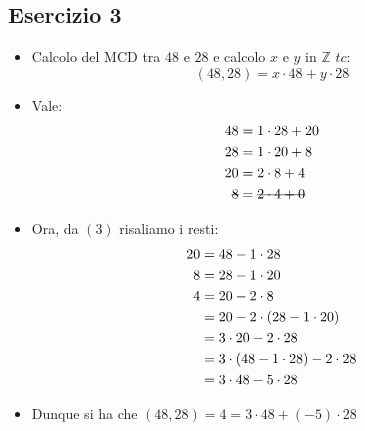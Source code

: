 \documentclass[10pt]{article}
\begin{document}
	\subsection{Esercizio 3}
	\begin{itemize}
	\item
	Calcolo del MCD tra $48$ e $28$ e calcolo $x$ e $y$ in $\mathbb{Z}$ $tc:$ $$(48,28) = x \cdot 48 + y \cdot 28$$
	\item
	Vale:
	\begin{equation}
	\begin{split}
	48 &= 1 \cdot 28 + 20 \\
	28 &= 1 \cdot 20 + 8 \\
	20 &= 2 \cdot 8 + 4 \\
	\hbox{\sout{$8$}} &= \hbox{\sout{$2 \cdot 4 + 0$}}
	\end{split}
	\end{equation}
	
	\item
	Ora, da $(3)$ risaliamo i resti:
	\begin{equation}
	\begin{split}
	20 &= 48 - 1 \cdot 28 \\
	8 &= 28 - 1 \cdot 20 \\
	4 &= 20 - 2 \cdot 8 \\
	& = 20 - 2 \cdot (28 - 1 \cdot 20) \\
	& = 3 \cdot 20 - 2 \cdot 28 \\
	& = 3 \cdot (48 - 1 \cdot 28) - 2 \cdot 28 \\
	& = 3 \cdot 48 - 5 \cdot 28 
	\notag
	\end{split}
	\end{equation}
	\item
	Dunque si ha che $(48,28) = 4 = 3 \cdot 48 + (-5) \cdot 28 $
	\end{itemize}
	
\end{document}

